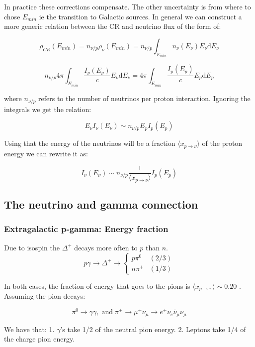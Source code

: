 \documentclass[
  letterpaper,
  DIV=11,
  numbers=noendperiod]{scrreprt}
\begin{document}
In practice these corrections compensate. The other uncertainty is from
where to chose \(E_{min}\) ie the transition to Galactic sources. In
general we can construct a more generic relation between the CR and
neutrino flux of the form of:

\[\rho_{CR}(E_{min}) = n_{\nu/p} \rho_{\nu}(E_{min}) = n_{\nu/p}\int_{E_{min}} n_\nu (E_\nu) E_\nu \mathrm{d} E_\nu\]

\[ n_{\nu/p} 4\pi \int_{E_{min}} \frac{I_\nu (E_\nu)}{c} E_\nu \mathrm{d} E_\nu = 4\pi \int_{E_{min}} \frac{I_p (E_p)}{c} E_p \mathrm{d} E_p \]

where \(n_{\nu/p}\) refers to the number of neutrinos per proton
interaction. Ignoring the integrals we get the relation:

\[E_\nu I_\nu (E_\nu) \sim n_{\nu/p} E_p I_p (E_p)\]

Using that the energy of the neutrinos will be a fraction
\(\langle x_{p\rightarrow \nu} \rangle\) of the proton energy we can
rewrite it as:

\[I_\nu (E_\nu) \sim n_{\nu/p} \frac{1}{\langle x_{p\rightarrow \nu} \rangle} I_p (E_p)\]

\subsection{The neutrino and gamma
connection}\label{the-neutrino-and-gamma-connection}

\subsubsection{Extragalactic p-gamma: Energy
fraction}\label{extragalactic-p-gamma-energy-fraction}

Due to isospin the \(\Delta^+\) decays more often to \(p\) than \(n\).
\[
p\gamma \rightarrow \Delta^+ \rightarrow \begin{cases}
p \pi^0 & (2/3)\\
  n \pi^+ & (1/3)
  \end{cases}\]

In both cases, the fraction of energy that goes to the pions is
\(\langle x_{p\rightarrow\pi}\rangle \sim 0.20\) . Assuming the pion
decays:

\[\pi^0 \rightarrow \gamma\gamma, \mathrm{\;and\;} \pi^+ \rightarrow \mu^+ \nu_\mu \rightarrow e^+ \nu_e \bar{\nu}_\mu \nu_\mu\]

We have that: 1. \(\gamma\)'s take 1/2 of the neutral pion energy. 2.
Leptons take 1/4 of the charge pion energy.
\end{document}
